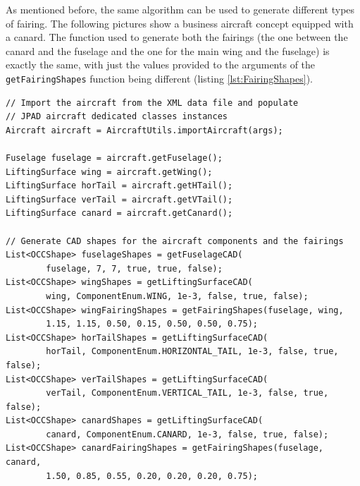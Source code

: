 \bigskip
\noindent
As mentioned before, the same algorithm can be used to generate different types of fairing. The following pictures show a business aircraft concept equipped with a canard. The function used to generate both the fairings (the one between the canard and the fuselage and the one for the main wing and the fuselage) is exactly the same, with just the values provided to the arguments of the \lstinline[language=Java]!getFairingShapes! function being different (listing \ref{lst:FairingShapes}).
%
\bigskip
\begin{lstlisting}[caption={Fairing CAD method application}, captionpos=b, tabsize=2, label={lst:FairingShapes}]
// Import the aircraft from the XML data file and populate
// JPAD aircraft dedicated classes instances
Aircraft aircraft = AircraftUtils.importAircraft(args);
		
Fuselage fuselage = aircraft.getFuselage();
LiftingSurface wing = aircraft.getWing();
LiftingSurface horTail = aircraft.getHTail();
LiftingSurface verTail = aircraft.getVTail();
LiftingSurface canard = aircraft.getCanard();

// Generate CAD shapes for the aircraft components and the fairings
List<OCCShape> fuselageShapes = getFuselageCAD(
		fuselage, 7, 7, true, true, false);				
List<OCCShape> wingShapes = getLiftingSurfaceCAD(
		wing, ComponentEnum.WING, 1e-3, false, true, false);				
List<OCCShape> wingFairingShapes = getFairingShapes(fuselage, wing,
		1.15, 1.15, 0.50, 0.15, 0.50, 0.50, 0.75);				
List<OCCShape> horTailShapes = getLiftingSurfaceCAD(
		horTail, ComponentEnum.HORIZONTAL_TAIL, 1e-3, false, true, false);				
List<OCCShape> verTailShapes = getLiftingSurfaceCAD(
		verTail, ComponentEnum.VERTICAL_TAIL, 1e-3, false, true, false);				
List<OCCShape> canardShapes = getLiftingSurfaceCAD(
		canard, ComponentEnum.CANARD, 1e-3, false, true, false);				
List<OCCShape> canardFairingShapes = getFairingShapes(fuselage, canard,
		1.50, 0.85, 0.55, 0.20, 0.20, 0.20, 0.75);
\end{lstlisting}
%
